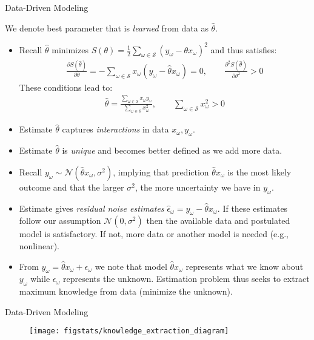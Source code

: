 \documentclass[9pt]{beamer}
\begin{document}
%
\begin{frame}{Data-Driven Modeling}

We denote best parameter that is {\em learned} from data as $\hat{\theta}$. 
\begin{itemize}
\setlength{\itemsep}{5pt}
\item Recall $\hat{\theta}$ minimizes $S(\theta)=\frac{1}{2}\sum_{\omega \in \mathcal{S}} (y_\omega-\theta x_\omega)^2$ and thus satisfies:
\begin{align*}
\frac{\partial S(\hat{\theta})}{\partial \theta}=-\sum_{\omega \in \mathcal{S}}x_\omega (y_\omega-\hat{\theta} x_\omega)=0,\qquad  \frac{\partial^2 S(\hat{\theta})}{\partial \theta^2}>0
\end{align*}
These conditions lead to:
\begin{align*}
\hat{\theta}=\frac{\sum_{\omega \in \mathcal{S}}x_\omega y_\omega}{\sum_{\omega \in \mathcal{S}}x_\omega^2},\qquad \sum_{\omega \in \mathcal{S}}x_\omega^2>0 
\end{align*}
\item Estimate $\hat{\theta}$ captures {\em interactions} in data $x_\omega,y_\omega$. 
\item Estimate $\hat{\theta}$ is {\em unique} and becomes better defined as we add more data. 
\item Recall $y_\omega \sim \mathcal{N}(\hat{\theta} x_\omega,\sigma^2)$, implying that prediction $\hat{\theta} x_\omega$ is the most likely outcome and that the larger $\sigma^2$, the more uncertainty we have in $y_\omega$. 
\item Estimate gives {\em residual noise estimates} $\hat{\epsilon}_\omega =y_\omega-\hat{\theta}x_\omega$. If these estimates follow our assumption $\mathcal{N}(0,\sigma^2)$ then the available data and postulated model is satisfactory. If not, more data or another model is needed (e.g., nonlinear). 

\item From $y_\omega=\hat{\theta}x_\omega+\epsilon_\omega$ we note that model $\hat{\theta}x_\omega$ represents what we know about $y_\omega$ while $\epsilon_\omega$ represents the unknown. Estimation problem thus seeks to extract maximum knowledge from data (minimize the unknown). 
\end{itemize}
\end{frame}

%
\begin{frame}{Data-Driven Modeling}

\begin{figure}[!htb]
    \centering
	\texttt{[image: figstats/knowledge\_extraction\_diagram]}
\end{figure}

\end{frame}
\end{document}
